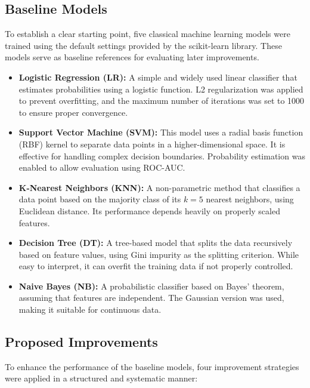 \documentclass[conference]{IEEEtran}
\begin{document}
\subsection{Baseline Models}

To establish a clear starting point, five classical machine learning models were trained using the default settings provided by the scikit-learn library. These models serve as baseline references for evaluating later improvements.

\begin{itemize}
\item \textbf{Logistic Regression (LR):} A simple and widely used linear classifier that estimates probabilities using a logistic function. L2 regularization was applied to prevent overfitting, and the maximum number of iterations was set to 1000 to ensure proper convergence.

\item \textbf{Support Vector Machine (SVM):} This model uses a radial basis function (RBF) kernel to separate data points in a higher-dimensional space. It is effective for handling complex decision boundaries. Probability estimation was enabled to allow evaluation using ROC-AUC.

\item \textbf{K-Nearest Neighbors (KNN):} A non-parametric method that classifies a data point based on the majority class of its $k=5$ nearest neighbors, using Euclidean distance. Its performance depends heavily on properly scaled features.

\item \textbf{Decision Tree (DT):} A tree-based model that splits the data recursively based on feature values, using Gini impurity as the splitting criterion. While easy to interpret, it can overfit the training data if not properly controlled.

\item \textbf{Naive Bayes (NB):} A probabilistic classifier based on Bayes’ theorem, assuming that features are independent. The Gaussian version was used, making it suitable for continuous data.
\end{itemize}

\subsection{Proposed Improvements}

To enhance the performance of the baseline models, four improvement strategies were applied in a structured and systematic manner:
\end{document}
